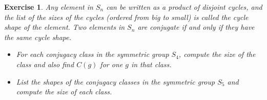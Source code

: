 \documentclass{article}
\newtheorem{exercise}[theorem]{Exercise}
\begin{document}
\begin{exercise}
Any element in \( S_n \) can be written as a product of disjoint cycles, and the list of the sizes of the cycles (ordered from big to small) is called the \textit{cycle shape} of the element. Two elements in \( S_n \) are conjugate if and only if they have the same cycle shape.
    \begin{itemize}
        \item[(a)] For each conjugacy class in the symmetric group \( S_4 \), compute the size of the class and also find \( C(g) \) for one \( g \) in that class.
        \item[(b)] List the shapes of the conjugacy classes in the symmetric group \( S_5 \) and compute the size of each class.
    \end{itemize}
\end{exercise}
\end{document}
